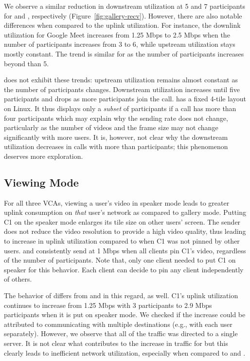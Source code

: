 We observe a similar reduction in downstream utilization at 5 and 7
participants for \zoom and \meet, respectively
(Figure~\ref{fig:gallery-recv}). However, there are also notable differences
when compared to the uplink utilization. For instance, the downlink
utilization for Google Meet increases from 1.25 Mbps to 2.5 Mbps when the
number of participants increases from 3 to 6, while upstream utilization stays
mostly constant. The trend is similar for \zoom as the number of participants
increases beyond than 5. 

\teams does not exhibit these trends: upstream utilization remains almost
constant as the number of participants changes. Downstream utilization
increases until five participants and drops as more participants join the call.
\teams has a fixed 4-tile layout on Linux. It thus displays
only a {\em subset} of participants if a call has more than four participants
which
may explain why the sending rate does not change, particularly as the number
of videos and the frame size may not
change significantly with more users. It is, however, not clear why the
downstream utilization decreases in calls with more than participants; this
phenomenon deserves more exploration. 

\subsection{Viewing Mode}

For all three VCAs, viewing a user's video in speaker mode leads to greater
uplink consumption on {\em that} user's network as compared to gallery mode.
Putting C1 on the speaker mode enlarges its tile size on other users' screen.
The sender does not reduce the video resolution to provide a high video
quality, thus leading to increase in uplink utilization compared to when C1
was not pinned by other users. \zoom and \meet consistently send at 1 Mbps
when all clients pin C1's video, regardless of the number of participants.
Note that, only one client needed to put C1 on speaker for this behavior. Each
client can decide to pin any client independently of others.

The behavior of \teams differs from \meet and \zoom in this regard, as well.
C1's uplink utilization continues to increase from 1.25 Mbps with 3
participants to 2.9 Mbps participants when it is put on speaker mode. We
checked if the increase could be attributed to \teams communicating with
multiple destinations (e.g., with each user separately). However, we observe
that all of the traffic was directed to a single server. It is not clear what
contributes to the increase in traffic for \teams but this clearly leads to
inefficient network utilization, especially when compared to \zoom and \meet. 

